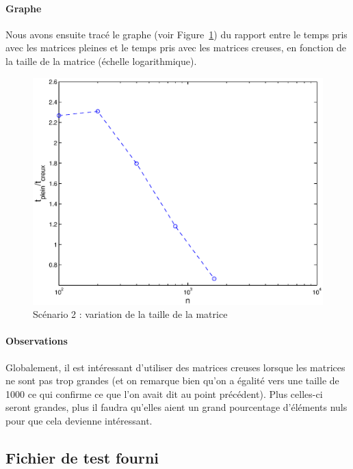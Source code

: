 \documentclass[12pt,a4paper]{article}
\begin{document}
\paragraph{Graphe}
Nous avons ensuite tracé le graphe (voir Figure~\ref{vtm}) du rapport entre le temps pris avec les matrices pleines et le temps pris avec les matrices creuses, en fonction de la taille de la matrice (échelle logarithmique).
\begin{figure}[!h]
	\begin{center}
		\includegraphics[width=15cm]{pourccst.eps}
		\caption{Scénario 2 : variation de la taille de la matrice}
		\label{vtm}
	\end{center}
\end{figure}

\paragraph{Observations}
Globalement, il est intéressant d'utiliser des matrices creuses lorsque les matrices ne sont pas trop grandes (et on remarque bien qu'on a égalité vers une taille de 1000 ce qui confirme ce que l'on avait dit au point précédent). Plus celles-ci seront grandes, plus il faudra qu'elles aient un grand pourcentage d'éléments nuls pour que cela devienne intéressant. 

\subsection{Fichier de test fourni}
\end{document}
